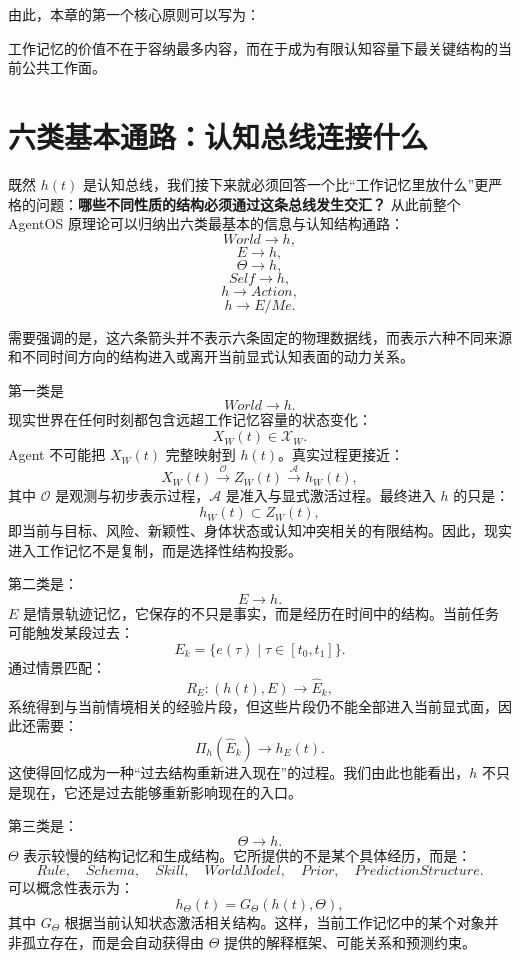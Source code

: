 由此，本章的第一个核心原则可以写为：
\begin{proposition*}
工作记忆的价值不在于容纳最多内容，而在于成为有限认知容量下最关键结构的当前公共工作面。
\end{proposition*}

\section{六类基本通路：认知总线连接什么}

既然 $h(t)$ 是认知总线，我们接下来就必须回答一个比“工作记忆里放什么”更严格的问题：\textbf{哪些不同性质的结构必须通过这条总线发生交汇？} 从此前整个 AgentOS 原理论可以归纳出六类最基本的信息与认知结构通路：
\[
World\rightarrow h,
\]
\[
E\rightarrow h,
\]
\[
\Theta\rightarrow h,
\]
\[
Self\rightarrow h,
\]
\[
h\rightarrow Action,
\]
\[
h\rightarrow E/Me.
\]

需要强调的是，这六条箭头并不表示六条固定的物理数据线，而表示六种不同来源和不同时间方向的结构进入或离开当前显式认知表面的动力关系。

第一类是
\[
World\rightarrow h.
\]
现实世界在任何时刻都包含远超工作记忆容量的状态变化：
\[
X_W(t)\in\mathcal X_W.
\]
Agent 不可能把 $X_W(t)$ 完整映射到 $h(t)$。真实过程更接近：
\[
X_W(t)
\xrightarrow{\mathcal O}
Z_W(t)
\xrightarrow{\mathcal A}
h_W(t),
\]
其中 $\mathcal O$ 是观测与初步表示过程，$\mathcal A$ 是准入与显式激活过程。最终进入 $h$ 的只是：
\[
h_W(t)\subset Z_W(t),
\]
即当前与目标、风险、新颖性、身体状态或认知冲突相关的有限结构。因此，现实进入工作记忆不是复制，而是选择性结构投影。

第二类是：
\[
E\rightarrow h.
\]
$E$ 是情景轨迹记忆，它保存的不只是事实，而是经历在时间中的结构。当前任务可能触发某段过去：
\[
E_k
=
\{e(\tau)\mid \tau\in[t_0,t_1]\}.
\]
通过情景匹配：
\[
R_E:
(h(t),E)\rightarrow \hat E_k,
\]
系统得到与当前情境相关的经验片段，但这些片段仍不能全部进入当前显式面，因此还需要：
\[
\Pi_h(\hat E_k)
\rightarrow h_E(t).
\]
这使得回忆成为一种“过去结构重新进入现在”的过程。我们由此也能看出，$h$ 不只是现在，它还是过去能够重新影响现在的入口。

第三类是：
\[
\Theta\rightarrow h.
\]
$\Theta$ 表示较慢的结构记忆和生成结构。它所提供的不是某个具体经历，而是：
\[
Rule,\quad Schema,\quad Skill,\quad WorldModel,\quad Prior,\quad PredictionStructure.
\]
可以概念性表示为：
\[
h_\Theta(t)
=
G_\Theta
\left(
h(t),
\Theta
\right),
\]
其中 $G_\Theta$ 根据当前认知状态激活相关结构。这样，当前工作记忆中的某个对象并非孤立存在，而是会自动获得由 $\Theta$ 提供的解释框架、可能关系和预测约束。

